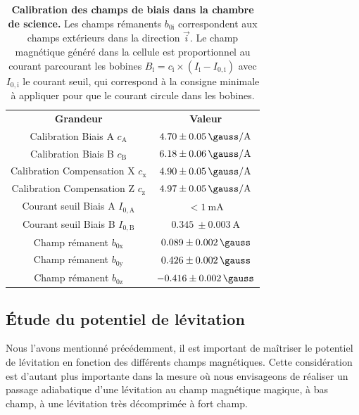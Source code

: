 \renewcommand{\arraystretch}{1.1}
\begin{table}[!h]
{
\begin{center}
\begin{tabular}{ c|c }
{\color{MainColor}\textbf{Grandeur}} & {\color{MainColor}\textbf{Valeur}} \\
Calibration Biais A $c_{\mathrm{A}}$ & $\SI{4.70}{}\pm\SI{0.05}{\gauss\per\ampere}$ \\
Calibration Biais B $c_{\mathrm{B}}$ & $\SI{6.18}{}\pm\SI{0.06}{\gauss\per\ampere}$ \\
Calibration Compensation X $c_{\mathrm{x}}$ & $\SI{4.90}{}\pm\SI{0.05}{\gauss\per\ampere}$ \\
Calibration Compensation Z $c_{\mathrm{z}}$ & $\SI{4.97}{}\pm\SI{0.05}{\gauss\per\ampere}$ \\
Courant seuil Biais A $I_{\mathrm{0,A}}$ & $< \SI{1}{\milli\ampere}$ \\
Courant seuil Biais B $I_{\mathrm{0,B}}$ & $\SI{0.345}{}\pm\SI{0.003}{\ampere}$ \\
Champ rémanent $b_{\mathrm{0x}}$ & $\SI{0.089}{}\pm\SI{0.002}{\gauss}$ \\
Champ rémanent $b_{\mathrm{0y}}$ & $\SI{0.426}{}\pm\SI{0.002}{\gauss}$ \\
Champ rémanent $b_{\mathrm{0z}}$ & $\SI{-0.416}{}\pm\SI{0.002}{\gauss}$ \\
\end{tabular}
\end{center}}
\caption{\textbf{Calibration des champs de biais dans la chambre de science.} Les champs rémanents $b_{\mathrm{0i}}$ correspondent aux champs extérieurs dans la direction $\vec{i}$. Le champ magnétique généré dans la cellule est proportionnel au courant parcourant les bobines $B_{\mathrm{i}} = c_{\mathrm{i}} \times (I_{\mathrm{i}}-I_{\mathrm{0,i}})$ avec $I_{\mathrm{0,i}}$ le courant seuil, qui correspond à la consigne minimale à appliquer pour que le courant circule dans les bobines.}
\label{tb:levitation_RF}
\end{table}
















\subsection{\'Etude du potentiel de lévitation}
\label{sc:oscillations_levitation}
Nous l'avons mentionné précédemment, il est important de maîtriser le potentiel de lévitation en fonction des différents champs magnétiques. Cette considération est d'autant plus importante dans la mesure où nous envisageons de réaliser un passage adiabatique d'une lévitation au champ magnétique magique, à bas champ, à une lévitation très décomprimée à fort champ. 

